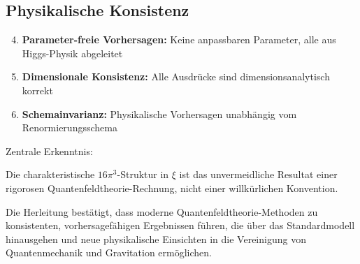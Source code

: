 \documentclass[12pt,a4paper]{article}
\theoremstyle{definition}
\begin{document}
	\subsection{Physikalische Konsistenz}
	\begin{enumerate}
		\setcounter{enumi}{3}
		\item \textbf{Parameter-freie Vorhersagen:} Keine anpassbaren Parameter, alle aus Higgs-Physik abgeleitet
		\item \textbf{Dimensionale Konsistenz:} Alle Ausdrücke sind dimensionsanalytisch korrekt
		\item \textbf{Schemainvarianz:} Physikalische Vorhersagen unabhängig vom Renormierungsschema
	\end{enumerate}
	
	\begin{formel}
		Zentrale Erkenntnis:
		
		Die charakteristische $16\pi^3$-Struktur in $\xi$ ist das unvermeidliche Resultat einer rigorosen Quantenfeldtheorie-Rechnung, nicht einer willkürlichen Konvention.
	\end{formel}
	
	Die Herleitung bestätigt, dass moderne Quantenfeldtheorie-Methoden zu konsistenten, vorhersagefähigen Ergebnissen führen, die über das Standardmodell hinausgehen und neue physikalische Einsichten in die Vereinigung von Quantenmechanik und Gravitation ermöglichen.
	
\end{document}
